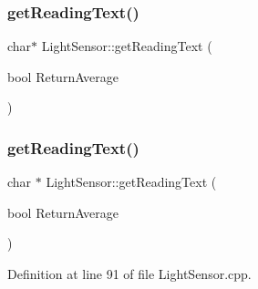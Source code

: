 \mbox{\label{class_light_sensor_a4430f299e7c8aafa47bc47ab291c78a3}} 
\subsubsection{\texorpdfstring{get\+Reading\+Text()}{getReadingText()}\hspace{0.1cm}{\footnotesize\ttfamily [1/2]}}
{\footnotesize\ttfamily char$\ast$ Light\+Sensor\+::get\+Reading\+Text (\begin{DoxyParamCaption}\item[{bool}]{Return\+Average }\end{DoxyParamCaption})}

\mbox{\label{class_light_sensor_af38ae75a6739383e1590548fdb07e353}} 
\subsubsection{\texorpdfstring{get\+Reading\+Text()}{getReadingText()}\hspace{0.1cm}{\footnotesize\ttfamily [2/2]}}
{\footnotesize\ttfamily char $\ast$ Light\+Sensor\+::get\+Reading\+Text (\begin{DoxyParamCaption}\item[{bool}]{Return\+Average }\end{DoxyParamCaption})}



Definition at line 91 of file Light\+Sensor.\+cpp.

